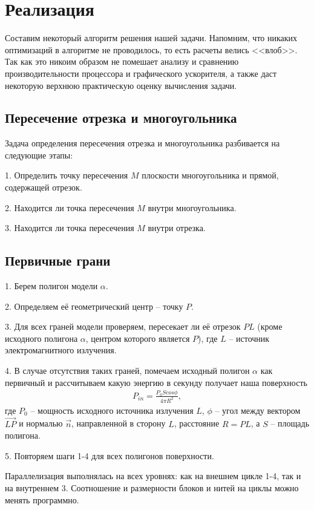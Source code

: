 \newpage
\section*{Реализация} 

Составим некоторый алгоритм решения нашей задачи. Напомним, что никаких оптимизаций в алгоритме не проводилось, то есть расчеты велись <<влоб>>. Так как это никоим образом не помешает анализу и сравнению производительности процессора и графического ускорителя, а также даст некоторую верхнюю практическую оценку вычисления задачи. 

\subsection*{Пересечение отрезка и многоугольника}

Задача определения пересечения отрезка и многоугольника разбивается на следующие этапы:

1. Определить точку пересечения $ M $ плоскости многоугольника и прямой, содержащей отрезок.

2. Находится ли точка пересечения $ M $ внутри многоугольника.

3. Находится ли точка пересечения $ M $ внутри отрезка.


\subsection*{Первичные грани}

1. Берем полигон модели $\alpha$.

2. Определяем её геометрический центр -- точку $P$.

3. Для всех граней модели проверяем, пересекает ли её отрезок $PL$ (кроме исходного полигона $\alpha$, центром которого является $P$), где $L$ -- источник электромагнитного излучения.

4. В случае отсутствия таких граней, помечаем исходный полигон $\alpha$ как первичный и рассчитываем какую энергию в секунду получает наша поверхность
\begin{gather}
  P_{in} = \frac{P_0 S cos\phi}{4 \pi R^2},
\end{gather}
где $P_0$ -- мощность исходного источника излучения $L$, $\phi$ -- угол между вектором $\vec {LP}$ и нормалью $\vec n$, направленной в сторону $L$, расстояние $R = PL$, а $S$ -- площадь полигона.

5. Повторяем шаги 1-4 для всех полигонов поверхности.

Параллелизация выполнялась на всех уровнях: как на внешнем цикле 1-4, так и на внутреннем 3. Соотношение и размерности блоков и нитей на циклы можно менять программно. 

